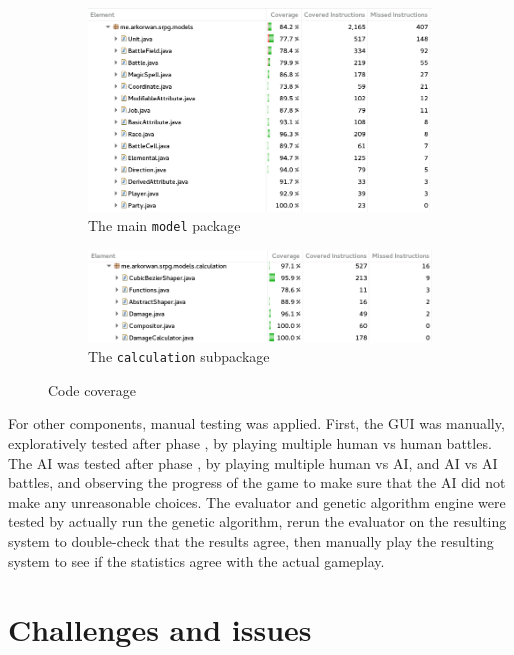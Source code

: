 \begin{figure}
	\centering
	
	\begin{subfigure}{1\textwidth}
		\centering
		\includegraphics[width=.9\linewidth]{figures/coverage_models.png}
		\caption{The main \texttt{model} package}
	\end{subfigure}
	
	\begin{subfigure}{1\textwidth}
		\centering
		\includegraphics[width=.9\linewidth]{figures/coverage_calculations.png}
		\caption{The \texttt{calculation} subpackage}
	\end{subfigure}
	\caption{Code coverage}
	\label{fig:coverage}
\end{figure}

For other components, manual testing was applied. First, the GUI was manually, exploratively tested after phase , by playing multiple human vs human battles. The AI was tested after phase , by playing multiple human vs AI, and AI vs AI battles, and observing the progress of the game to make sure that the AI did not make any unreasonable choices. The evaluator and genetic algorithm engine were tested by actually run the genetic algorithm, rerun the evaluator on the resulting system to double-check that the results agree, then manually play the resulting system to see if the statistics agree with the actual gameplay.

\section{Challenges and issues}

